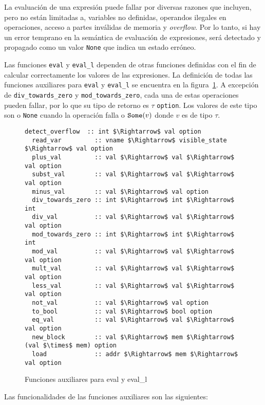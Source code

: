 La evaluación de una expresión puede fallar por diversas razones que incluyen, pero no están limitadas a, variables no definidas, operandos ilegales en operaciones, acceso a partes inválidas de memoria y \textit{overflow}.
Por lo tanto, si hay un error temprano en la semántica de evaluación de expresiones, será detectado y propagado como un valor \verb|None| que indica un estado erróneo.

Las funciones \verb|eval| y \verb|eval_l| dependen de otras funciones definidas con el fin de calcular correctamente los valores de las expresiones.
La definición de todas las funciones auxiliares para \verb|eval| y \verb|eval_l| se encuentra en la figura~\ref{fig:aux_fun_eval}.
A excepción de \verb|div_towards_zero| y \verb|mod_towards_zero|, cada una de estas operaciones pueden fallar, por lo que su tipo de retorno es $\tau$ \verb|option|.
Los valores de este tipo son o \verb|None| cuando la operación falla o $\verb|Some|(v)$ donde $v$ es de tipo $\tau$.

\begin{figure}
  \begin{lstlisting}[mathescape=true, frame=single]
  detect_overflow  :: int $\Rightarrow$ val option
  read_var         :: vname $\Rightarrow$ visible_state $\Rightarrow$ val option
  plus_val         :: val $\Rightarrow$ val $\Rightarrow$ val option
  subst_val        :: val $\Rightarrow$ val $\Rightarrow$ val option
  minus_val        :: val $\Rightarrow$ val option
  div_towards_zero :: int $\Rightarrow$ int $\Rightarrow$ int
  div_val          :: val $\Rightarrow$ val $\Rightarrow$ val option
  mod_towards_zero :: int $\Rightarrow$ int $\Rightarrow$ int
  mod_val          :: val $\Rightarrow$ val $\Rightarrow$ val option
  mult_val         :: val $\Rightarrow$ val $\Rightarrow$ val option
  less_val         :: val $\Rightarrow$ val $\Rightarrow$ val option
  not_val          :: val $\Rightarrow$ val option
  to_bool          :: val $\Rightarrow$ bool option
  eq_val           :: val $\Rightarrow$ val $\Rightarrow$ val option
  new_block        :: val $\Rightarrow$ mem $\Rightarrow$ (val $\times$ mem) option
  load             :: addr $\Rightarrow$ mem $\Rightarrow$ val option
  \end{lstlisting}

  \caption{Funciones auxiliares para eval y eval\_l}
  \label{fig:aux_fun_eval}
\end{figure}

Las funcionalidades de las funciones auxiliares son las siguientes:

